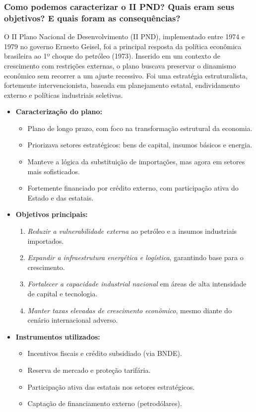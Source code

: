 \documentclass[a4paper,12pt]{article}[abntex2]
\begin{document}
\subsubsection{\textbf{Como podemos caracterizar o II PND? Quais eram seus objetivos? E quais foram as consequências?}}

O II Plano Nacional de Desenvolvimento (II PND), implementado entre 1974 e 1979 no governo Ernesto Geisel, foi a principal resposta da política econômica brasileira ao 1º choque do petróleo (1973). Inserido em um contexto de crescimento com restrições externas, o plano buscava preservar o dinamismo econômico sem recorrer a um ajuste recessivo. Foi uma estratégia estruturalista, fortemente intervencionista, baseada em planejamento estatal, endividamento externo e políticas industriais seletivas.

\begin{itemize}
    \item \textbf{Caracterização do plano:}
    \begin{itemize}
        \item Plano de longo prazo, com foco na transformação estrutural da economia.
        \item Priorizava setores estratégicos: bens de capital, insumos básicos e energia.
        \item Manteve a lógica da substituição de importações, mas agora em setores mais sofisticados.
        \item Fortemente financiado por crédito externo, com participação ativa do Estado e das estatais.
    \end{itemize}

    \item \textbf{Objetivos principais:}
    \begin{enumerate}
        \item \textit{Reduzir a vulnerabilidade externa} ao petróleo e a insumos industriais importados.
        \item \textit{Expandir a infraestrutura energética e logística}, garantindo base para o crescimento.
        \item \textit{Fortalecer a capacidade industrial nacional} em áreas de alta intensidade de capital e tecnologia.
        \item \textit{Manter taxas elevadas de crescimento econômico}, mesmo diante do cenário internacional adverso.
    \end{enumerate}

    \item \textbf{Instrumentos utilizados:}
    \begin{itemize}
        \item Incentivos fiscais e crédito subsidiado (via BNDE).
        \item Reserva de mercado e proteção tarifária.
        \item Participação ativa das estatais nos setores estratégicos.
        \item Captação de financiamento externo (petrodólares).
    \end{itemize}


\end{itemize}
\end{document}
